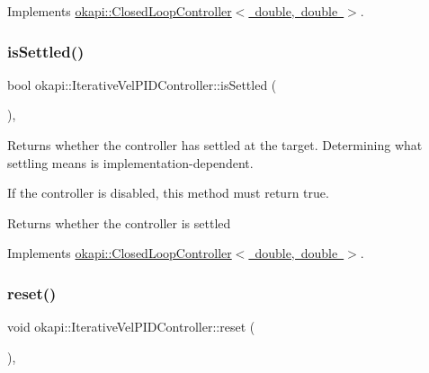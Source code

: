 Implements \mbox{\hyperlink{classokapi_1_1ClosedLoopController_a40bd4ec2b8c75503fbf6f494fd7cbe69}{okapi\+::\+Closed\+Loop\+Controller$<$ double, double $>$}}.

\mbox{\label{classokapi_1_1IterativeVelPIDController_a818347e199d8e7fd3e11f9f1aa369749}} 
\subsubsection{\texorpdfstring{isSettled()}{isSettled()}}
{\footnotesize\ttfamily bool okapi\+::\+Iterative\+Vel\+P\+I\+D\+Controller\+::is\+Settled (\begin{DoxyParamCaption}{ }\end{DoxyParamCaption})\hspace{0.3cm}{\ttfamily [override]}, {\ttfamily [virtual]}}

Returns whether the controller has settled at the target. Determining what settling means is implementation-\/dependent.

If the controller is disabled, this method must return true.

\begin{DoxyReturn}{Returns}
whether the controller is settled 
\end{DoxyReturn}


Implements \mbox{\hyperlink{classokapi_1_1ClosedLoopController_aed7aa0e94b6474c28314f8517d6cb4d8}{okapi\+::\+Closed\+Loop\+Controller$<$ double, double $>$}}.

\mbox{\label{classokapi_1_1IterativeVelPIDController_a51607c29e072a672522a9e93bbd12410}} 
\subsubsection{\texorpdfstring{reset()}{reset()}}
{\footnotesize\ttfamily void okapi\+::\+Iterative\+Vel\+P\+I\+D\+Controller\+::reset (\begin{DoxyParamCaption}{ }\end{DoxyParamCaption})\hspace{0.3cm}{\ttfamily [override]}, {\ttfamily [virtual]}}

